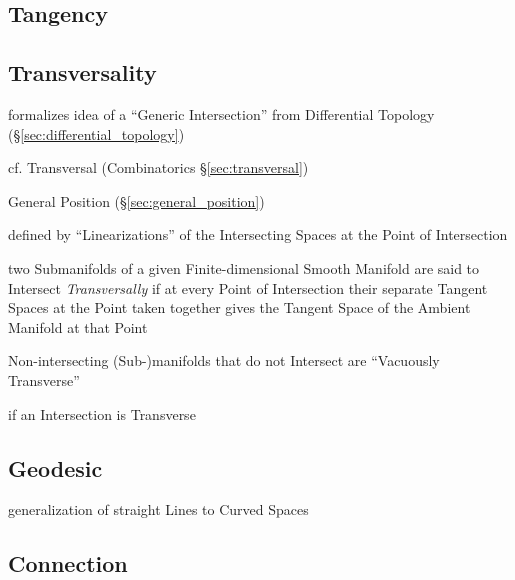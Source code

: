 \begin{itemize}
\subsection{Tangency}\label{sec:tangency}

\subsection{Transversality}\label{sec:transversality}

formalizes idea of a ``Generic Intersection'' from Differential Topology
(\S\ref{sec:differential_topology})

cf. Transversal (Combinatorics \S\ref{sec:transversal})

General Position (\S\ref{sec:general_position})

defined by ``Linearizations'' of the Intersecting Spaces at the Point of
Intersection

two Submanifolds of a given Finite-dimensional Smooth Manifold are said to
Intersect \emph{Transversally} if at every Point of Intersection their separate
Tangent Spaces at the Point taken together gives the Tangent Space of the
Ambient Manifold at that Point

Non-intersecting (Sub-)manifolds that do not Intersect are ``Vacuously
Transverse''

if an Intersection is Transverse



\subsection{Geodesic}\label{sec:geodesic}

generalization of straight Lines to Curved Spaces



\subsection{Connection}\label{sec:connection}


\end{itemize}
